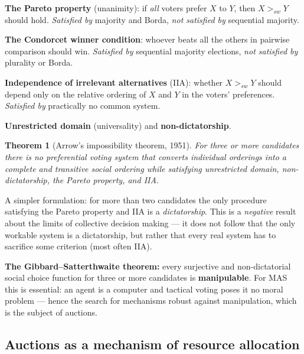 \documentclass[11pt,a4paper]{article}
\newtheorem{theorem}{Theorem}[section]
\theoremstyle{definition}
\begin{document}
\begin{defbox}
\textbf{The Pareto property} (unanimity): if \emph{all} voters prefer $X$ to $Y$, then
$X >_{sw} Y$ should hold. \emph{Satisfied by} majority and Borda, \emph{not satisfied by}
sequential majority.

\textbf{The Condorcet winner condition}: whoever beats all the others in pairwise comparison
should win. \emph{Satisfied by} sequential majority elections, \emph{not satisfied by} plurality
or Borda.

\textbf{Independence of irrelevant alternatives} (IIA): whether $X >_{sw} Y$ should depend only
on the relative ordering of $X$ and $Y$ in the voters' preferences. \emph{Satisfied by}
practically no common system.

\textbf{Unrestricted domain} (universality) and \textbf{non-dictatorship}.
\end{defbox}

\begin{theorem}[Arrow's impossibility theorem, 1951]
For three or more candidates there is no preferential voting system that converts individual
orderings into a complete and transitive social ordering while satisfying unrestricted domain,
non-dictatorship, the Pareto property, and IIA.
\end{theorem}

A simpler formulation: for more than two candidates the only procedure satisfying the Pareto
property and IIA is a \emph{dictatorship}. This is a \emph{negative} result about the limits of
collective decision making --- it does not follow that the only workable system is a
dictatorship, but rather that every real system has to sacrifice some criterion (most often
IIA).

\textbf{The Gibbard--Satterthwaite theorem:} every surjective and non-dictatorial social choice
function for three or more candidates is \textbf{manipulable}. For MAS this is essential: an
agent is a computer and tactical voting poses it no moral problem --- hence the search for
mechanisms robust against manipulation, which is the subject of auctions.
\subsection{Auctions as a mechanism of resource allocation}
\label{ssec:aukce}
\end{document}
